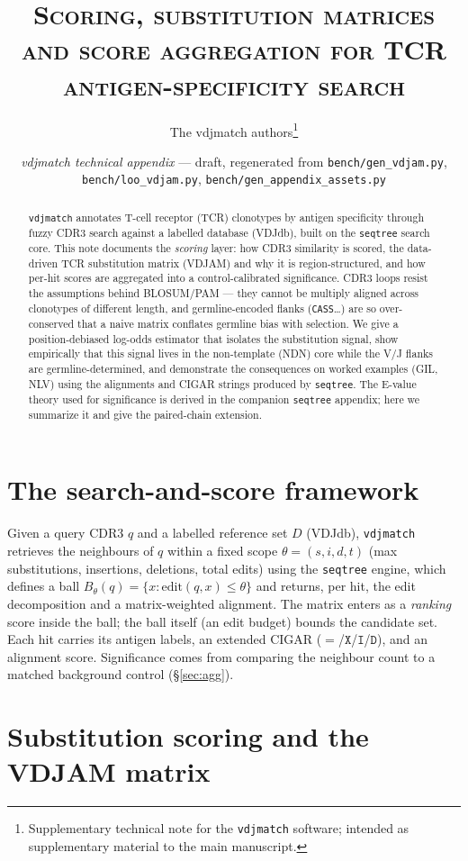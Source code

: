 \documentclass[11pt]{article}
\title{\scshape Scoring, substitution matrices and score aggregation for
TCR antigen-specificity search}
\author{The vdjmatch authors\thanks{Supplementary technical note for the \texttt{vdjmatch} software;
intended as supplementary material to the main manuscript.}}
\date{\small\textit{vdjmatch technical appendix} --- draft, regenerated from
\texttt{bench/gen\_vdjam.py}, \texttt{bench/loo\_vdjam.py}, \texttt{bench/gen\_appendix\_assets.py}}
\theoremstyle{oldplain}
\theoremstyle{oldrem}
\newcommand{\ball}[2]{B_{#1}(#2)}
\begin{document}
\maketitle

\begin{abstract}
\noindent
\texttt{vdjmatch} annotates T-cell receptor (TCR) clonotypes by antigen specificity through fuzzy
CDR3 search against a labelled database (VDJdb), built on the \texttt{seqtree} search core. This note
documents the \emph{scoring} layer: how CDR3 similarity is scored, the data-driven TCR substitution
matrix (VDJAM) and why it is region-structured, and how per-hit scores are aggregated into a
control-calibrated significance. CDR3 loops resist the assumptions behind BLOSUM/PAM --- they cannot
be multiply aligned across clonotypes of different length, and germline-encoded flanks
(\texttt{CASS}\dots) are so over-conserved that a naive matrix conflates germline bias with selection.
We give a position-debiased log-odds estimator that isolates the substitution signal, show
empirically that this signal lives in the non-template (NDN) core while the V/J flanks are
germline-determined, and demonstrate the consequences on worked examples (GIL, NLV) using the
alignments and CIGAR strings produced by \texttt{seqtree}. The E-value theory used for significance is
derived in the companion \texttt{seqtree} appendix; here we summarize it and give the paired-chain
extension.
\end{abstract}

\section{The search-and-score framework}
Given a query CDR3 $q$ and a labelled reference set $D$ (VDJdb), \texttt{vdjmatch} retrieves the
neighbours of $q$ within a fixed scope $\theta=(s,i,d,t)$ (max substitutions, insertions, deletions,
total edits) using the \texttt{seqtree} engine, which defines a ball $\ball{\theta}{q}=\{x:
\mathrm{edit}(q,x)\le\theta\}$ and returns, per hit, the edit decomposition and a matrix-weighted
alignment. The matrix enters as a \emph{ranking} score inside the ball; the ball itself (an edit
budget) bounds the candidate set. Each hit carries its antigen labels, an extended CIGAR
($=$/$\mathtt{X}$/$\mathtt{I}$/$\mathtt{D}$), and an alignment score. Significance comes from comparing
the neighbour count to a matched background control (\S\ref{sec:agg}).

\section{Substitution scoring and the VDJAM matrix}\label{sec:vdjam}
\end{document}
